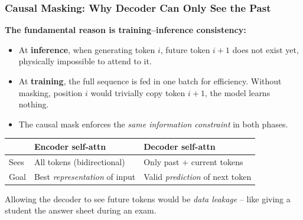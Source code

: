 \begin{frame}[fragile]\frametitle{Causal Masking: Why Decoder Can Only See the Past}
\textbf{The fundamental reason is training–inference consistency:}
\begin{itemize}
\item At \textbf{inference}, when generating token $i$, future token $i+1$ does not exist yet,  physically impossible to attend to it.
\item At \textbf{training}, the full sequence is fed in one batch for efficiency.
Without masking, position $i$ would trivially copy token $i+1$,  the model learns nothing.
\item The causal mask enforces the \emph{same information constraint} in both phases.
\end{itemize}
\vspace{0.4em}
\begin{center}
\small
\renewcommand{\arraystretch}{1.3}
\begin{tabular}{|l|l|l|}
\hline
 & \textbf{Encoder self-attn} & \textbf{Decoder self-attn} \\
\hline
Sees & All tokens (bidirectional) & Only past + current tokens \\
Goal & Best \emph{representation} of input & Valid \emph{prediction} of next token \\
\hline
\end{tabular}
\end{center}
\vspace{0.3em}
Allowing the decoder to see future tokens would be \emph{data leakage} –
like giving a student the answer sheet during an exam.
\end{frame}


